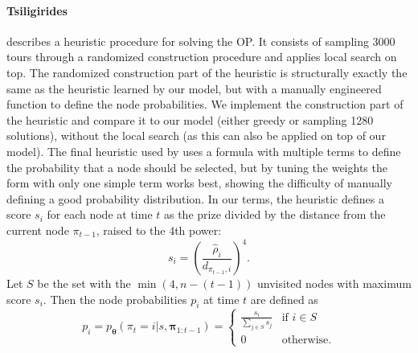 \paragraph{Tsiligirides}
\citet{tsiligirides1984heuristic} describes a heuristic procedure for solving the OP. It consists of sampling 3000 tours through a randomized construction procedure and applies local search on top. The randomized construction part of the heuristic is structurally exactly the same as the heuristic learned by our model, but with a manually engineered function to define the node probabilities. We implement the construction part of the heuristic and compare it to our model (either greedy or sampling 1280 solutions), without the local search (as this can also be applied on top of our model). The final heuristic used by \citet{tsiligirides1984heuristic} uses a formula with multiple terms to define the probability that a node should be selected, but by tuning the weights the form with only one simple term works best, showing the difficulty of manually defining a good probability distribution. In our terms, the heuristic defines a score $s_i$ for each node at time $t$ as the prize divided by the distance from the current node $\pi_{t-1}$, raised to the 4th power:
\begin{equation}
    s_i = \left(\frac{\hat{\rho}_i}{d_{\pi_{t-1},i}}\right)^4.
\end{equation}
Let $S$ be the set with the $\min(4, n - (t - 1))$ unvisited nodes with maximum score $s_i$. Then the node probabilities $p_i$ at time $t$ are defined as
\begin{equation}
	\label{dec:probabilities_tsili}
    p_i = p_{\bm{\theta}}(\pi_t = i|s, \bm{\pi}_{1:t-1}) =  \begin{cases}
        \frac{s_i}{\sum_{j \in S}{s_j}} & \text{if } i \in S \\
        0 & \text{otherwise.}
    \end{cases}
\end{equation}

